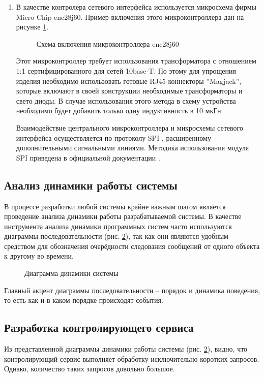 \begin{enumerate}
	\item В качестве контролера сетевого интерфейса используется микросхема фирмы Micro Chip
	enc28j60. Пример включения этого микроконтроллера дан на рисунке \ref{img:ienc28j60}.
	\begin{figure}[ht]
		\caption{Схема включения микроконтроллера enc28j60}
		\label{img:ienc28j60}
	\end{figure}
	
	Этот микроконтроллер требует использования трансформатора с отношением 1:1 сертифицированного
	для сетей 10base-T. По этому для упрощения изделия необходимо использовать готовые RJ45
	коннекторы ''Magjack'', которые включают в своей конструкции необходимые трансформаторы и
	свето диоды. В случае использования этого метода в схему устройства необходимо будет добавить
	только одну индуктивность в 10 мкГн.
	
	Взаимодействие центрального микроконтроллера и микросхемы сетевого интерфейса осуществляется
	по протоколу SPI \cite{enc28j60}, расширенному дополнительными сигнальными линиями. Методика
	использования модуля SPI приведена в официальной документации \cite{avrspi}.
\end{enumerate}


\subsection{Анализ динамики работы системы}
В процессе разработки любой системы крайне важным шагом является проведение анализа динамики
работы разрабатываемой системы.
В качестве инструмента анализа динамики программных систем часто используются диаграммы последовательности (рис. \ref{img:dynamic}),
так как они являются удобным средством для обозначения очерёдности следования сообщений от одного объекта к другому во времени.
\begin{figure}[ht]
	\caption{Диаграмма динамики системы}
	\label{img:dynamic}
\end{figure}
Главный акцент диаграммы последовательности -- порядок и динамика поведения, то есть как и в каком порядке происходят события.

\subsection{Разработка контролирующего сервиса}
Из представленной диаграммы динамики работы системы (рис. \ref{img:dynamic}), видно,
что контролирующий сервис выполняет обработку исключительно коротких запросов. Однако, количество таких
запросов довольно большое.

